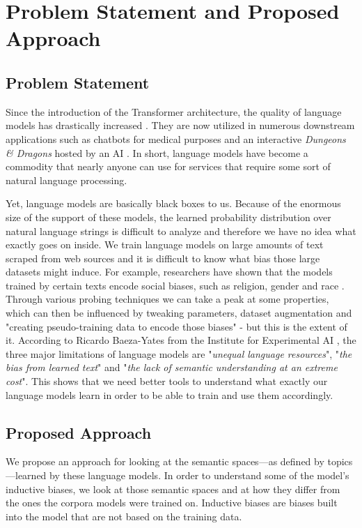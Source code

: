 \chapter{Problem Statement and Proposed Approach}

\section{Problem Statement}
Since the introduction of the Transformer architecture, the quality of language models has drastically increased \cite{devlin2018bert, radford2018improving}. They are now utilized in numerous downstream applications such as chatbots for medical purposes and an interactive \textit{Dungeons \& Dragons} hosted by an AI \cite{aidungeon}. In short, language models have become a commodity that nearly anyone can use for services that require some sort of natural language processing. 

Yet, language models are basically black boxes to us. Because of the enormous size of the support of these models, the learned probability distribution over natural language strings is difficult to analyze and therefore we have no idea what exactly goes on inside. We train language models on large amounts of text scraped from web sources and it is difficult to know what bias those large datasets might induce. For example, researchers have shown that the models trained by certain texts encode social biases, such as religion, gender and race \cite{abid2021persistent}. Through various probing techniques we can take a peak at some properties, which can then be influenced by tweaking parameters, dataset augmentation and "creating pseudo-training data to encode those biases" \cite{MarasovicGradient2018NLP} - but this is the extent of it. According to Ricardo Baeza-Yates from the Institute for Experimental AI \cite{lmfail}, the three major limitations of language models are "\textit{unequal language resources}", "\textit{the bias from learned text}" and "\textit{the lack of semantic understanding at an extreme cost}". This shows that we need better tools to understand what exactly our language models learn in order to be able to train and use them accordingly. 
\section{Proposed Approach}
We propose an approach for looking at the semantic spaces---as defined by topics---learned by these language models. In order to understand some of the model's inductive biases, we look at those semantic spaces and at how they differ from the ones the corpora models were trained on. Inductive biases are biases built into the model that are not based on the training data.


